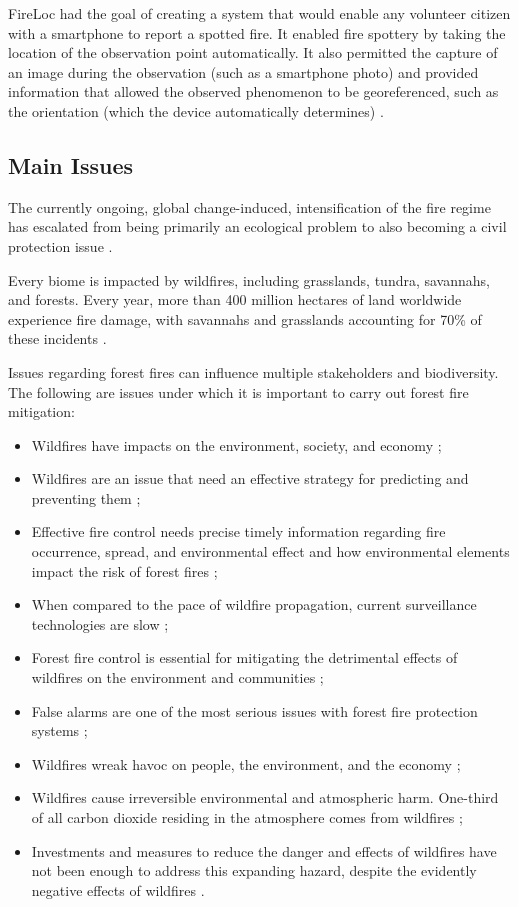FireLoc had the goal of creating a system that would enable any volunteer citizen with a smartphone to report a spotted fire. It enabled fire spottery by taking the location of the observation point automatically. It also permitted the capture of an image during the observation (such as a smartphone photo) and provided information that allowed the observed phenomenon to be georeferenced, such as the orientation (which the device automatically determines) \cite{silva2020fire, Fireloc2023}.




\subsection{Main Issues}
The currently ongoing, global change-induced, intensification of the fire regime has escalated from being primarily an ecological problem to also becoming a civil protection issue \cite{f12040469}. 


Every biome is impacted by wildfires, including grasslands, tundra, savannahs, and forests. Every year, more than 400 million hectares of land worldwide experience fire damage, with savannahs and grasslands accounting for 70\% of these incidents \cite{UNDESA2023}.


Issues regarding forest fires can influence multiple stakeholders and biodiversity. The following are issues under which it is important to carry out forest fire mitigation:
\begin{itemize}
    \item Wildfires have impacts on the environment, society, and economy \cite{UNDESA2023};
    \item Wildfires are an issue that need an effective strategy for predicting and preventing them \cite{9726029};
    \item Effective fire control needs precise timely information regarding fire occurrence, spread, and environmental effect and how environmental elements impact the risk of forest fires \cite{arif2021role, 10085661};
    \item When compared to the pace of wildfire propagation, current surveillance technologies are slow \cite{9726029};
    \item Forest fire control is essential for mitigating the detrimental effects of wildfires on the environment and communities \cite{10085661};
    \item False alarms are one of the most serious issues with forest fire protection systems \cite{9726029};
    \item Wildfires wreak havoc on people, the environment, and the economy \cite{10085661} \cite{Sharma2020};
    \item Wildfires cause irreversible environmental and atmospheric harm. One-third of all carbon dioxide residing in the atmosphere comes from wildfires \cite{doi:10.1155/2014/597368};
    \item Investments and measures to reduce the danger and effects of wildfires have not been enough to address this expanding hazard, despite the evidently negative effects of wildfires \cite{UNDESA2023}.
\end{itemize}


